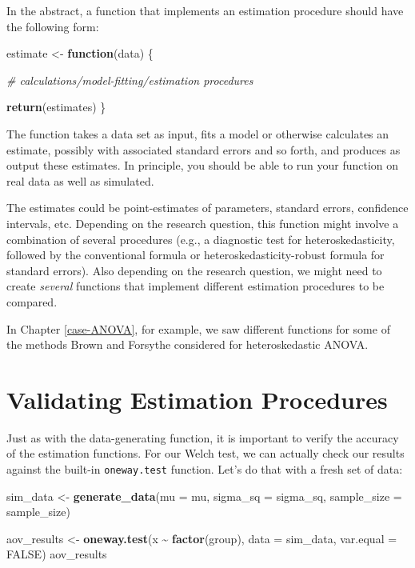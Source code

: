\documentclass[
]{book}
\newenvironment{Shaded}{\begin{snugshade}}{\end{snugshade}}
\newcommand{\AttributeTok}[1]{\textcolor[rgb]{0.13,0.29,0.53}{#1}}
\newcommand{\CommentTok}[1]{\textcolor[rgb]{0.56,0.35,0.01}{\textit{#1}}}
\newcommand{\ConstantTok}[1]{\textcolor[rgb]{0.56,0.35,0.01}{#1}}
\newcommand{\ControlFlowTok}[1]{\textcolor[rgb]{0.13,0.29,0.53}{\textbf{#1}}}
\newcommand{\FunctionTok}[1]{\textcolor[rgb]{0.13,0.29,0.53}{\textbf{#1}}}
\newcommand{\NormalTok}[1]{#1}
\newcommand{\OtherTok}[1]{\textcolor[rgb]{0.56,0.35,0.01}{#1}}
\newcommand{\SpecialCharTok}[1]{\textcolor[rgb]{0.81,0.36,0.00}{\textbf{#1}}}
\begin{document}
In the abstract, a function that implements an estimation procedure should have the following form:

\begin{Shaded}
\begin{Highlighting}[]
\NormalTok{estimate }\OtherTok{\textless{}{-}} \ControlFlowTok{function}\NormalTok{(data) \{}

  \CommentTok{\# calculations/model{-}fitting/estimation procedures}
  
  \FunctionTok{return}\NormalTok{(estimates)}
\NormalTok{\}}
\end{Highlighting}
\end{Shaded}

The function takes a data set as input, fits a model or otherwise calculates an estimate, possibly with associated standard errors and so forth, and produces as output these estimates.
In principle, you should be able to run your function on real data as well as simulated.

The estimates could be point-estimates of parameters, standard errors, confidence intervals, etc.
Depending on the research question, this function might involve a combination of several procedures (e.g., a diagnostic test for heteroskedasticity, followed by the conventional formula or heteroskedasticity-robust formula for standard errors).
Also depending on the research question, we might need to create \emph{several} functions that implement different estimation procedures to be compared.

In Chapter \ref{case-ANOVA}, for example, we saw different functions for some of the methods Brown and Forsythe considered for heteroskedastic ANOVA.

\section{Validating Estimation Procedures}\label{validating-estimation-procedures}

Just as with the data-generating function, it is important to verify the accuracy of the estimation functions.
For our Welch test, we can actually check our results against the built-in \texttt{oneway.test} function. Let's do that with a fresh set of data:

\begin{Shaded}
\begin{Highlighting}[]
\NormalTok{sim\_data }\OtherTok{\textless{}{-}} \FunctionTok{generate\_data}\NormalTok{(}\AttributeTok{mu =}\NormalTok{ mu, }\AttributeTok{sigma\_sq =}\NormalTok{ sigma\_sq,}
                          \AttributeTok{sample\_size =}\NormalTok{ sample\_size)}

\NormalTok{aov\_results }\OtherTok{\textless{}{-}} \FunctionTok{oneway.test}\NormalTok{(x }\SpecialCharTok{\textasciitilde{}} \FunctionTok{factor}\NormalTok{(group),}
                           \AttributeTok{data =}\NormalTok{ sim\_data, }
                           \AttributeTok{var.equal =} \ConstantTok{FALSE}\NormalTok{)}
\NormalTok{aov\_results}
\end{Highlighting}
\end{Shaded}
\end{document}
